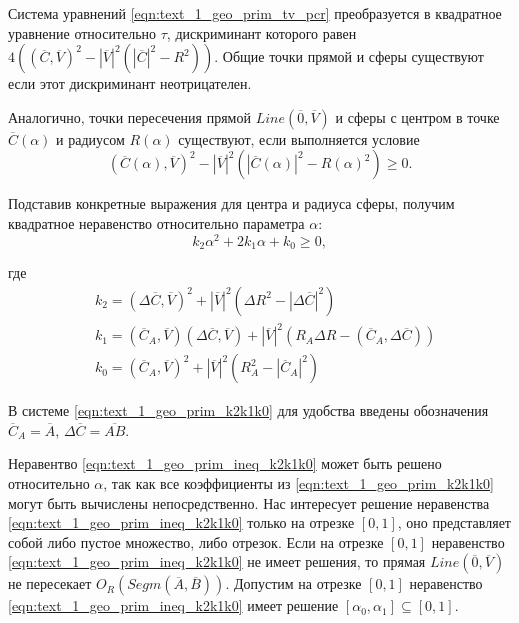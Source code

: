 Система уравнений \eqref{eqn:text_1_geo_prim_tv_pcr} преобразуется в квадратное уравнение относительно $\tau$, дискриминант которого равен $4\left((\overline{C}, \overline{V})^2 - |\overline{V}|^2 \left(|\overline{C}|^2 - R^2\right)\right)$.
Общие точки прямой и сферы существуют если этот дискриминант неотрицателен.

Аналогично, точки пересечения прямой $Line(\overline{0}, \overline{V})$ и сферы с центром в точке $\overline{C}(\alpha)$ и радиусом $R(\alpha)$ существуют, если выполняется условие
\begin{equation}
	(\overline{C}(\alpha), \overline{V})^2 - |\overline{V}|^2 \left(|\overline{C}(\alpha)|^2 - R(\alpha)^2\right) \ge 0.
\end{equation}

Подставив конкретные выражения для центра и радиуса сферы, получим квадратное неравенство относительно параметра $\alpha$:
\begin{equation}\label{eqn:text_1_geo_prim_ineq_k2k1k0}
	k_2 \alpha^2 + 2 k_1 \alpha + k_0 \ge 0,
\end{equation}

где
\begin{equation}\label{eqn:text_1_geo_prim_k2k1k0}
	\begin{aligned}
		& k_2 = (\Delta \overline{C}, \overline{V})^2 + |\overline{V}|^2 \left( \Delta R^2 - |\Delta \overline{C}|^2 \right) \\
		& k_1 = (\overline{C}_A, \overline{V})(\Delta \overline{C}, \overline{V}) + |\overline{V}|^2 \left(R_A \Delta R - (\overline{C}_A, \Delta \overline{C}) \right) \\
		& k_0 = (\overline{C}_A, \overline{V})^2 + |\overline{V}|^2 \left( R_A^2 - |\overline{C}_A|^2 \right)
	\end{aligned}
\end{equation}

В системе \eqref{eqn:text_1_geo_prim_k2k1k0} для удобства введены обозначения $\overline{C}_A = \overline{A}$, $\Delta \overline{C} = \overline{AB}$.

Неравентво \eqref{eqn:text_1_geo_prim_ineq_k2k1k0} может быть решено относительно $\alpha$, так как все коэффициенты из \eqref{eqn:text_1_geo_prim_k2k1k0} могут быть вычислены непосредственно.
Нас интересует решение неравенства \eqref{eqn:text_1_geo_prim_ineq_k2k1k0} только на отрезке $[0,1]$, оно представляет собой либо пустое множество, либо отрезок.
Если на отрезке $[0,1]$ неравенство \eqref{eqn:text_1_geo_prim_ineq_k2k1k0} не имеет решения, то прямая $Line(\overline{0}, \overline{V})$ не пересекает $O_R(Segm(\overline{A}, \overline{B}))$.
Допустим на отрезке $[0,1]$ неравенство \eqref{eqn:text_1_geo_prim_ineq_k2k1k0} имеет решение $[\alpha_0, \alpha_1] \subseteq [0, 1]$.
 
